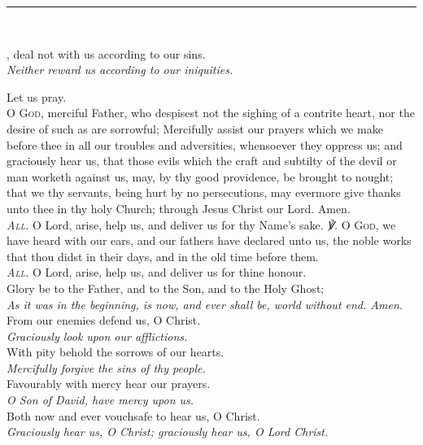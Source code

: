 \par\noindent
{\centering
	\rule{50ex}{.25mm}\\
}
\par\noindent
{}, deal not with us according to our sins.\\
\textit{Neither reward us according to our iniquities.}
\par
Let us pray.\\
\textsc{O God}, merciful Father, who despisest not the sighing of a contrite heart, nor the desire of such as are sorrowful; Mercifully assist our prayers which we make before thee in all our troubles and adversities, whensoever they oppress us; and graciously hear us, that those evils which the craft and subtilty of the devil or man worketh against us, may, by thy good providence, be brought to nought; that we thy servants, being hurt by no persecutions, may evermore give thanks unto thee in thy holy Church; through Jesus Christ our Lord. Amen.\\
\textit{\scshape All.} O Lord, arise, help us, and deliver us for thy Name's sake.
\textit{\scshape ℣.} \textsc{O God}, we have heard with our ears, and our fathers have declared unto us, the noble works that thou didst in their days, and in the old time before them.\\
\textit{\scshape All.} O Lord, arise, help us, and deliver us for thine honour.\\
    Glory be to the Father, and to the Son, and to the Holy Ghost;\\
    \textit{As it was in the beginning, is now, and ever shall be, world without end. Amen.}\\
    From our enemies defend us, O Christ.\\
    \textit{Graciously look upon our afflictions.}\\
    With pity behold the sorrows of our hearts.\\
    \textit{Mercifully forgive the sins of thy people.}\\
    Favourably with mercy hear our prayers.\\
    \textit{O Son of David, have mercy upon us.}\\
    Both now and ever vouchsafe to hear us, O Christ.\\
    \textit{Graciously hear us, O Christ; graciously hear us, O Lord Christ.}\\
